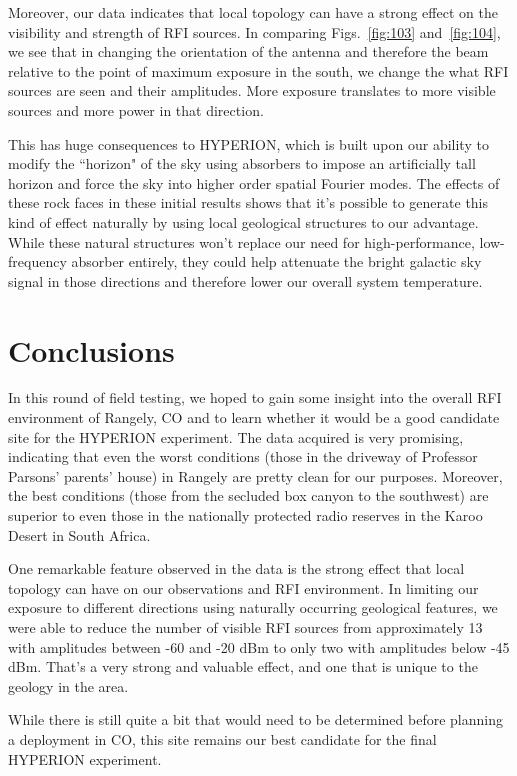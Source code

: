 \documentclass[11pt]{article}
\begin{document}
Moreover, our data indicates that local topology can have a strong effect on 
the visibility and strength of RFI sources. In comparing Figs.~\ref{fig:103} 
and~\ref{fig:104}, we see that in changing the orientation of the antenna and 
therefore the beam relative to the point of maximum exposure in the south, we 
change the what RFI sources are seen and their amplitudes. More exposure 
translates to more visible sources and more power in that direction.

This has huge consequences to HYPERION, which is built upon our ability to 
modify the ``horizon" of the sky using absorbers to impose an artificially tall 
horizon and force the sky into higher order spatial Fourier modes. The effects 
of these rock faces in these initial results shows that it's possible to 
generate this kind of effect naturally by using local geological structures to 
our advantage. While these natural structures won't replace our need for 
high-performance, low-frequency absorber entirely, they could help attenuate 
the bright galactic sky signal in those directions and therefore lower our 
overall system temperature.

\section{Conclusions}

In this round of field testing, we hoped to gain some insight into the overall 
RFI environment of Rangely, CO and to learn whether it would be a good 
candidate site for the HYPERION experiment. The data acquired is very 
promising, indicating that even the worst conditions (those in the driveway of 
Professor Parsons' parents' house) in Rangely are pretty clean for our 
purposes.  Moreover, the best conditions (those from the secluded box canyon to 
the southwest) are superior to even those in the nationally protected radio 
reserves in the Karoo Desert in South Africa.

One remarkable feature observed in the data is the strong effect that local 
topology can have on our observations and RFI environment. In limiting our 
exposure to different directions using naturally occurring geological features, 
we were able to reduce the number of visible RFI sources from approximately 13  
with amplitudes between -60 and -20 dBm to only two with amplitudes below -45 
dBm.  That's a very strong and valuable effect, and one that is unique to the 
geology in the area.

While there is still quite a bit that would need to be determined before 
planning a deployment in CO, this site remains our best candidate for the final 
HYPERION experiment.
\end{document}
